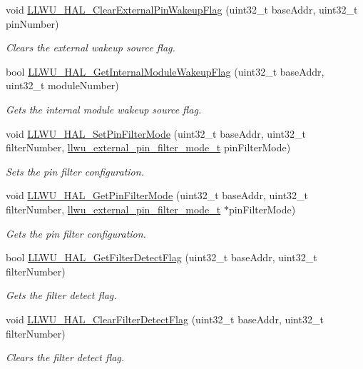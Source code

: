 \begin{DoxyCompactItemize}
void \hyperlink{group__llwu__hal_ga19641cc9bd568b41cccb19418a61c456}{L\+L\+W\+U\+\_\+\+H\+A\+L\+\_\+\+Clear\+External\+Pin\+Wakeup\+Flag} (uint32\+\_\+t base\+Addr, uint32\+\_\+t pin\+Number)
\begin{DoxyCompactList}\small\item\em Clears the external wakeup source flag. \end{DoxyCompactList}\item 
bool \hyperlink{group__llwu__hal_gad6f1591ca4d7a1365fc049915fe3e903}{L\+L\+W\+U\+\_\+\+H\+A\+L\+\_\+\+Get\+Internal\+Module\+Wakeup\+Flag} (uint32\+\_\+t base\+Addr, uint32\+\_\+t module\+Number)
\begin{DoxyCompactList}\small\item\em Gets the internal module wakeup source flag. \end{DoxyCompactList}\item 
void \hyperlink{group__llwu__hal_ga33e5d1683e2d239c9e9dfb1ef0e3595f}{L\+L\+W\+U\+\_\+\+H\+A\+L\+\_\+\+Set\+Pin\+Filter\+Mode} (uint32\+\_\+t base\+Addr, uint32\+\_\+t filter\+Number, \hyperlink{group__llwu__hal_gac8214238539a6dde5aa93d96bef7fa12}{llwu\+\_\+external\+\_\+pin\+\_\+filter\+\_\+mode\+\_\+t} pin\+Filter\+Mode)
\begin{DoxyCompactList}\small\item\em Sets the pin filter configuration. \end{DoxyCompactList}\item 
void \hyperlink{group__llwu__hal_ga8f3cc3ac1623922869432fb8d740df85}{L\+L\+W\+U\+\_\+\+H\+A\+L\+\_\+\+Get\+Pin\+Filter\+Mode} (uint32\+\_\+t base\+Addr, uint32\+\_\+t filter\+Number, \hyperlink{group__llwu__hal_gac8214238539a6dde5aa93d96bef7fa12}{llwu\+\_\+external\+\_\+pin\+\_\+filter\+\_\+mode\+\_\+t} $\ast$pin\+Filter\+Mode)
\begin{DoxyCompactList}\small\item\em Gets the pin filter configuration. \end{DoxyCompactList}\item 
bool \hyperlink{group__llwu__hal_ga4e6327d304f7c8f7ec0912af77283a07}{L\+L\+W\+U\+\_\+\+H\+A\+L\+\_\+\+Get\+Filter\+Detect\+Flag} (uint32\+\_\+t base\+Addr, uint32\+\_\+t filter\+Number)
\begin{DoxyCompactList}\small\item\em Gets the filter detect flag. \end{DoxyCompactList}\item 
void \hyperlink{group__llwu__hal_ga22af73ae3c5d9647ddfac3575a11a8cf}{L\+L\+W\+U\+\_\+\+H\+A\+L\+\_\+\+Clear\+Filter\+Detect\+Flag} (uint32\+\_\+t base\+Addr, uint32\+\_\+t filter\+Number)
\begin{DoxyCompactList}\small\item\em Clears the filter detect flag. \end{DoxyCompactList}\end{DoxyCompactItemize}



